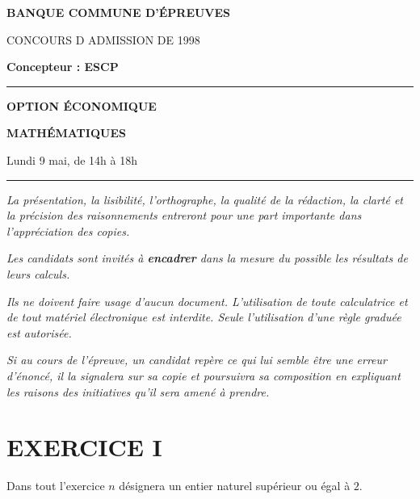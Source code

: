 \documentclass[11pt]{article}%
\begin{document}

\begin{center}
{\LARG\E\textbf{BANQUE COMMUNE D'ÉPREUVES}}



{\large \textsc{CONCOURS D ADMISSION DE 1998}}



{\large \textbf{Concepteur : ESCP}}



\rule{2.39cm}{0.05cm}



{\Large \textbf{OPTION ÉCONOMIQUE}}



{\Large \textbf{MATHÉMATIQUES }}



{\Large Lundi 9 mai, de 14h à 18h}



\rule{2.39cm}{0.05cm}
\end{center}

\textit{La présentation, la lisibilité, l'orthographe, la qualité
de la rédaction, la clarté et la précision des raisonnements
entreront pour une part importante dans l'appréciation des copies.}

\textit{Les candidats sont invités à \textbf{encadrer} dans la mesure
du possible les résultats de leurs calculs.}

\textit{Ils ne doivent faire usage d'aucun document. L'utilisation de
toute
calculatrice et de tout matériel électronique est interdite. Seule
l'utilisation d'une règle graduée est autorisée.}

\textit{Si au cours de l'épreuve, un candidat repère ce qui lui semble
être une erreur d'énoncé, il la signalera sur sa copie et
poursuivra sa composition en expliquant les raisons des initiatives
qu'il sera
amené à prendre.}

\vspace*{3cm}

\section*{\textbf{EXERCICE I}}

Dans tout l'exercice $n$ désignera un entier naturel supérieur ou égal
à $2$.
\end{document}
